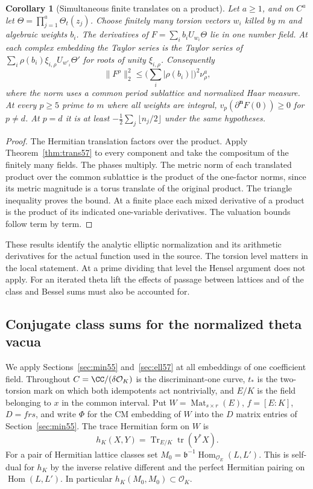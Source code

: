\documentclass[a4paper,11pt]{article}
\newtheorem{corollary}[proposition]{Corollary}
\theoremstyle{definition}
\theoremstyle{remark}
\numberwithin{equation}{section}
\newcommand{\OO}{\mathcal O}
\begin{document}
\begin{corollary}[Simultaneous finite translates on a product]\leavevmode\label{cor:prod57}
Let \(a\ge1\), and on \(C^a\) let \(\Theta=\prod_{j=1}^a\Theta_t(z_j)\).
Choose finitely many torsion vectors \(w_i\) killed by \(m\) and
algebraic weights \(b_i\). The derivatives of
\(F=\sum_i b_i U_{w_i}\Theta\) lie in one number field. At each
complex embedding the Taylor series is the Taylor series of
\(\sum_i \rho(b_i)\xi_{i,\rho}U_{w'_{i}}\Theta'\) for roots of
unity \(\xi_{i,\rho}\). Consequently
\[
       \|F^\rho\|_2^2
        \le \Big(\sum_i|\rho(b_i)|\Big)^2\nu_\rho^a ,
\]
where the norm uses a common period sublattice and normalized Haar
measure. At every \(p\ge5\) prime to \(m\) where all weights are
integral, \(v_p(\partial^{\boldsymbol n}F(0))\ge0\) for \(p\ne d\).
At \(p=d\) it is at least
\(-\tfrac12\sum_j\lfloor n_j/2\rfloor\) under the same hypotheses.
\end{corollary}
\begin{proof}
The Hermitian translation factors over the product. Apply
Theorem~\ref{thm:trans57} to every component and take the
compositum of the finitely many fields. The phases multiply.
The metric norm of each translated product over the common
sublattice is the product of the one-factor norms, since its
metric magnitude is a torus translate of the original product.
The triangle inequality proves the bound. At a finite place each
mixed derivative of a product is the product of its indicated
one-variable derivatives. The valuation bounds follow term by term.
\end{proof}

These results identify the analytic elliptic normalization and its
arithmetic derivatives for the actual function used in the source.
The torsion level matters in the local statement. At a prime dividing
that level the Hensel argument does not apply. For an iterated theta
lift the effects of passage between lattices and of the class and
Bessel sums must also be accounted for.

\subsection{Conjugate class sums for the normalized theta vacua}\label{nav:V-12}
\label{sec:arch59}

We apply Sections~\ref{sec:min55} and~\ref{sec:ell57} at all
embeddings of one coefficient field. Throughout \(C=\CC/(\delta
\OO_K)\) is the discriminant-one curve, \(t_*\) is the two-torsion
mark on which both idempotents act nontrivially, and \(E/K\) is
the field belonging to \(x\) in the common interval. Put
\(W=\operatorname{Mat}_{s\times r}(E)\), \(f=[E:K]\),
\(D=frs\), and write \(\Phi\) for the CM embedding of \(W\) into
the \(D\) matrix entries of Section~\ref{sec:min55}.
The trace Hermitian form on \(W\) is
\[
          h_K(X,Y)=\operatorname{Tr}_{E/K}\operatorname{tr}(Y^*X).
\]
For a pair of Hermitian lattice classes set
\(M_0=\mathfrak b^{-1}\operatorname{Hom}_{\OO_E}(L,L')\).
This is self-dual for \(h_K\) by the inverse relative different
and the perfect Hermitian pairing on \(\operatorname{Hom}(L,L')\).
In particular \(h_K(M_0,M_0)\subset\OO_K\).
\end{document}
